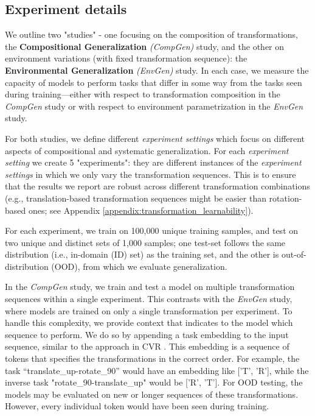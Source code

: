 \subsection{Experiment details} \label{sec:experiment_details}

We outline two "studies" - one focusing on the composition of transformations, the \textbf{Compositional Generalization} \textit{(CompGen)} study, and the other on environment variations (with fixed transformation sequence): the \textbf{Environmental Generalization} \textit{(EnvGen)} study. In each case, we measure the capacity of models to perform tasks that differ in some way from the tasks seen during training---either with respect to transformation composition in the \textit{CompGen} study or with respect to environment parametrization in the \textit{EnvGen} study.

For both studies, we define different \textit{experiment settings} which focus on different aspects of compositional and systematic generalization. For each \textit{experiment setting} we create 5 "experiments": they are different instances of the \textit{experiment settings} in which we only vary the transformation sequences. This is to ensure that the results we report are robust across different transformation combinations (e.g., translation-based transformation sequences might be easier than rotation-based ones; see Appendix \ref{appendix:transformation_learnability}).

For each experiment, we train on 100,000 unique training samples, and test on two unique and distinct sets of 1,000 samples; one test-set follows the same distribution (i.e., in-domain (ID) set) as the training set, and the other is out-of-distribution (OOD), from which we evaluate generalization.  

In the \textit{CompGen} study, we train and test a model on multiple transformation sequences within a single experiment. This contrasts with the \textit{EnvGen} study, where models are trained on only a single transformation per experiment. To handle this complexity, we provide context that indicates to the model which sequence to perform. We do so by appending a task embedding to the input sequence, similar to the approach in CVR \cite{cvr2022}. This embedding is a sequence of tokens that specifies the transformations in the correct order. For example, the task “translate\_up-rotate\_90” would have an embedding like ['T', 'R'], while the inverse task "rotate\_90-translate\_up" would be ['R', 'T'].
For OOD testing, the models may be evaluated on new or longer sequences of these transformations. However, every individual token would have been seen during training. 

